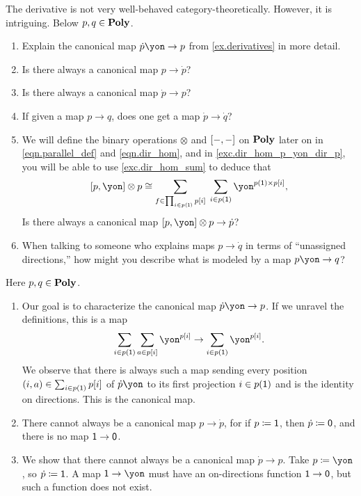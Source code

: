 \documentclass[Book-Poly]{subfiles}
\begin{document}
\begin{exercise}
The derivative is not very well-behaved category-theoretically.
However, it is intriguing.
Below $p, q \in \mathbf{Poly}$.
\begin{enumerate}
	\item Explain the canonical map $\dot{p}\yon\to p$ from \cref{ex.derivatives} in more detail.
	\item Is there always a canonical map $p\to \dot{p}$?
	\item Is there always a canonical map $\dot{p}\to p$?
	\item If given a map $p\to q$, does one get a map $\dot{p}\to\dot{q}$?
	\item We will define the binary operations $\otimes$ and $[-,-]$ on $\mathbf{Poly}$ later on in \eqref{eqn.parallel_def} and \eqref{eqn.dir_hom}, and in \cref{exc.dir_hom_p_yon_dir_p}, you will be able to use \cref{exc.dir_hom_sum} to deduce that
	\begin{equation} \label{eqn.dir_hom_p_yon_dir_p}
	    \ihom{p, \yon} \otimes p \iso \sum_{f \in \prod_{i \in p(\1)} p[i]} \; \sum_{i \in p(\1)} \yon^{p(\1) \times p[i]},
	\end{equation}
	Is there always a canonical map $\ihom{p,\yon}\otimes p\to \dot{p}$?
	\item When talking to someone who explains maps $p\to\dot{q}$ in terms of ``unassigned directions,'' how might you describe what is modeled by a map $p\yon\to q$?
	\qedhere
\end{enumerate}
\begin{solution}
Here $p, q \in \mathbf{Poly}$.
\begin{enumerate}
	\item Our goal is to characterize the canonical map $\dot{p}\yon\to p$.
	If we unravel the definitions, this is a map
	\[
	    \sum_{i \in p(\1)} \sum_{a \in p[i]} \yon^{p[i]} \to \sum_{i \in p(\1)} \yon^{p[i]}.
	\]
	We observe that there is always such a map sending every position $(i, a) \in \sum_{i \in p(\textsf{1})} p[i]$ of $\dot{p}\yon$ to its first projection $i \in p(\textsf{1})$ and is the identity on directions.
	This is the canonical map.

	\item There cannot always be a canonical map $p\to \dot{p}$, for if $p \coloneqq \textsf{1}$, then $\dot{p} \coloneqq \textsf{0}$, and there is no map $\textsf{1} \to \textsf{0}$.
	
	\item We show that there cannot always be a canonical map $\dot{p}\to p$.
	Take $p \coloneqq \yon$, so $\dot{p} \coloneqq \textsf{1}$.
	A map $\1 \to \yon$ must have an on-directions function $\textsf{1} \to \textsf{0}$, but such a function does not exist.
	

\end{enumerate}
\end{solution}
\end{exercise}
\end{document}
